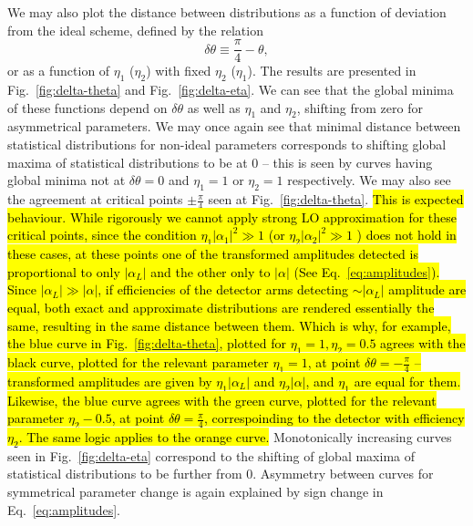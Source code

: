 We may also plot the distance between distributions as a function of deviation from the ideal scheme, defined by the relation
\begin{equation}
        \delta\theta\equiv\frac{\pi}{4}-\theta,
\end{equation}
or as a function of $\eta_1$ ($\eta_2$) with fixed $\eta_2$ ($\eta_1$). The results are presented in Fig.~\ref{fig:delta-theta} and Fig.~\ref{fig:delta-eta}. We can see that the global minima of these functions depend on $\delta\theta$ as well as $\eta_1$ and $\eta_2$, shifting from zero for asymmetrical parameters. We may once again see that minimal distance between statistical distributions for non-ideal parameters corresponds to shifting global maxima of statistical distributions to be at $0$ -- this is seen by curves having global minima not at $\delta\theta=0$ and $\eta_{1}=1$ or $\eta_{2}=1$ respectively. 
We may also see the agreement at critical points $\pm\frac{\pi}{4}$ seen at Fig.~\ref{fig:delta-theta}. \hl{This is expected behaviour. While rigorously we cannot apply strong LO approximation for these critical points, since the condition $\eta_1|\alpha_1|^2\gg1$  (or $\eta_2|\alpha_2|^2\gg1$ ) does not hold in these cases, at these points one of the transformed amplitudes detected is proportional to only $|\alpha_L|$ and the other only to $|\alpha|$ (See Eq.{~\eqref{eq:amplitudes})}. Since $|\alpha_L|\gg|\alpha|$, if efficiencies of the detector arms detecting $\sim|\alpha_L|$ amplitude are equal, both exact and approximate distributions are rendered essentially the same, resulting in the same distance between them. Which is why, for example, the blue curve in Fig.{~\ref{fig:delta-theta}}, plotted for  $\eta_1=1, \eta_2=0.5$ agrees with the black curve, plotted for the relevant parameter $\eta_1=1$, at point $\delta\theta=-\frac{\pi}{4}$ -- transformed amplitudes are given by $\eta_1|\alpha_L|$ and $\eta_2|\alpha|$, and $\eta_1$ are equal for them. Likewise, the blue curve agrees with the green curve, plotted for the relevant parameter $\eta_2-0.5$, at point $\delta\theta=\frac{\pi}{4}$, correspoinding to the detector with efficiency $\eta_2$. The same logic applies to the orange curve.}
Monotonically increasing curves seen in Fig.~\ref{fig:delta-eta} correspond to the shifting of global maxima of statistical distributions to be further from $0$. Asymmetry between curves for symmetrical parameter change is again explained by sign change in Eq.~\eqref{eq:amplitudes}. 

